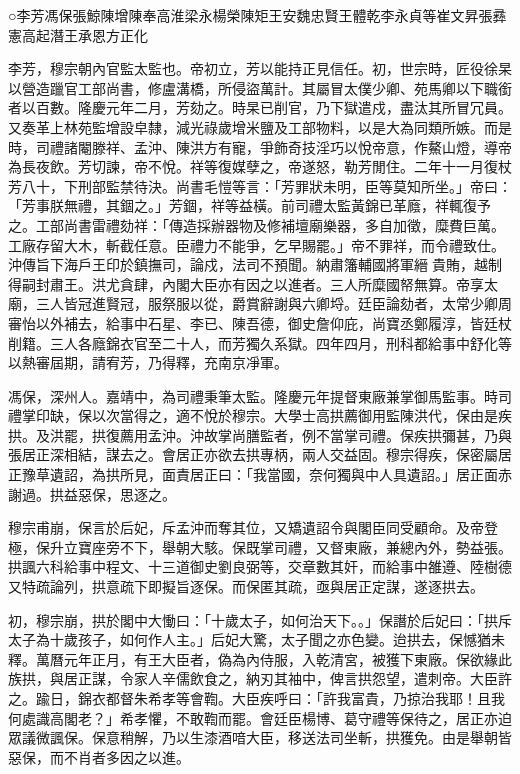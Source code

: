
\begin{pinyinscope}
○李芳馮保張鯨陳增陳奉高淮梁永楊榮陳矩王安魏忠賢王體乾李永貞等崔文昇張彞憲高起潛王承恩方正化

李芳，穆宗朝內官監太監也。帝初立，芳以能持正見信任。初，世宗時，匠役徐杲以營造躐官工部尚書，修盧溝橋，所侵盜萬計。其屬冒太僕少卿、苑馬卿以下職銜者以百數。隆慶元年二月，芳劾之。時杲已削官，乃下獄遣戍，盡汰其所冒冗員。又奏革上林苑監增設皁隸，減光祿歲增米鹽及工部物料，以是大為同類所嫉。而是時，司禮諸閹滕祥、孟沖、陳洪方有寵，爭飾奇技淫巧以悅帝意，作鰲山燈，導帝為長夜飲。芳切諫，帝不悅。祥等復媒孽之，帝遂怒，勒芳閒住。二年十一月復杖芳八十，下刑部監禁待決。尚書毛愷等言：「芳罪狀未明，臣等莫知所坐。」帝曰：「芳事朕無禮，其錮之。」芳錮，祥等益橫。前司禮太監黃錦已革廕，祥輒復予之。工部尚書雷禮劾祥：「傳造採辦器物及修補壇廟樂器，多自加徵，糜費巨萬。工廠存留大木，斬截任意。臣禮力不能爭，乞早賜罷。」帝不罪祥，而令禮致仕。沖傳旨下海戶王印於鎮撫司，論戍，法司不預聞。納肅籓輔國將軍縉貴賄，越制得嗣封肅王。洪尤貪肆，內閣大臣亦有因之以進者。三人所糜國帑無算。帝享太廟，三人皆冠進賢冠，服祭服以從，爵賞辭謝與六卿埒。廷臣論劾者，太常少卿周審怡以外補去，給事中石星、李已、陳吾德，御史詹仰庇，尚寶丞鄭履淳，皆廷杖削籍。三人各廕錦衣官至二十人，而芳獨久系獄。四年四月，刑科都給事中舒化等以熱審屆期，請宥芳，乃得釋，充南京凈軍。

馮保，深州人。嘉靖中，為司禮秉筆太監。隆慶元年提督東廠兼掌御馬監事。時司禮掌印缺，保以次當得之，適不悅於穆宗。大學士高拱薦御用監陳洪代，保由是疾拱。及洪罷，拱復薦用孟沖。沖故掌尚膳監者，例不當掌司禮。保疾拱彌甚，乃與張居正深相結，謀去之。會居正亦欲去拱專柄，兩人交益固。穆宗得疾，保密屬居正豫草遺詔，為拱所見，面責居正曰：「我當國，奈何獨與中人具遺詔。」居正面赤謝過。拱益惡保，思逐之。

穆宗甫崩，保言於后妃，斥孟沖而奪其位，又矯遺詔令與閣臣同受顧命。及帝登極，保升立寶座旁不下，舉朝大駭。保既掌司禮，又督東廠，兼總內外，勢益張。拱諷六科給事中程文、十三道御史劉良弼等，交章數其奸，而給事中雒遵、陸樹德又特疏論列，拱意疏下即擬旨逐保。而保匿其疏，亟與居正定謀，遂逐拱去。

初，穆宗崩，拱於閣中大慟曰：「十歲太子，如何治天下。。」保譖於后妃曰：「拱斥太子為十歲孩子，如何作人主。」后妃大驚，太子聞之亦色變。迨拱去，保憾猶未釋。萬曆元年正月，有王大臣者，偽為內侍服，入乾清宮，被獲下東廠。保欲緣此族拱，與居正謀，令家人辛儒飲食之，納刃其袖中，俾言拱怨望，遣刺帝。大臣許之。踰日，錦衣都督朱希孝等會鞫。大臣疾呼曰：「許我富貴，乃掠治我耶！且我何處識高閣老？」希孝懼，不敢鞫而罷。會廷臣楊博、葛守禮等保待之，居正亦迫眾議微諷保。保意稍解，乃以生漆酒喑大臣，移送法司坐斬，拱獲免。由是舉朝皆惡保，而不肖者多因之以進。


\end{pinyinscope}

